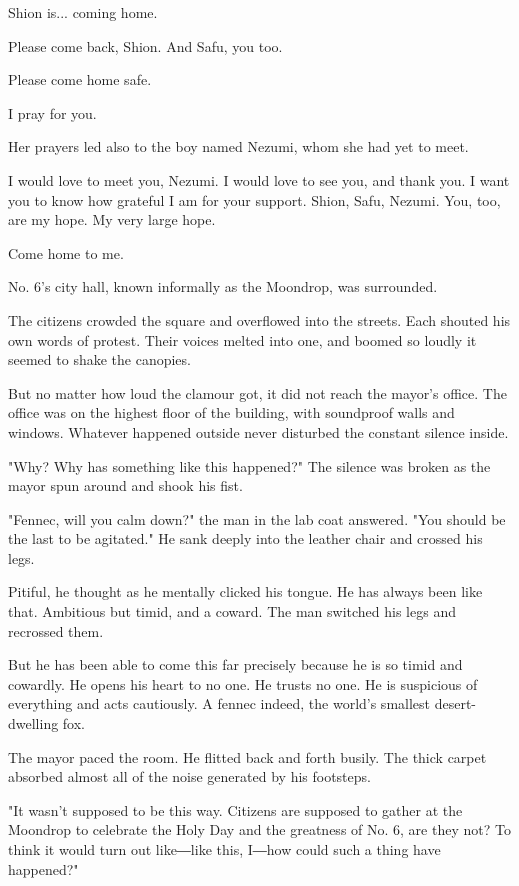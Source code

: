 Shion is... coming home.

Please come back, Shion. And Safu, you too.

Please come home safe.

I pray for you.

Her prayers led also to the boy named Nezumi, whom she had yet to meet.

I would love to meet you, Nezumi. I would love to see you, and thank
you. I want you to know how grateful I am for your support. Shion, Safu,
Nezumi. You, too, are my hope. My very large hope.

Come home to me.

No. 6's city hall, known informally as the Moondrop, was surrounded.

The citizens crowded the square and overflowed into the streets. Each
shouted his own words of protest. Their voices melted into one, and
boomed so loudly it seemed to shake the canopies.

But no matter how loud the clamour got, it did not reach the mayor's
office. The office was on the highest floor of the building, with
soundproof walls and windows. Whatever happened outside never disturbed
the constant silence inside.

"Why? Why has something like this happened?" The silence was broken as
the mayor spun around and shook his fist.~

"Fennec, will you calm down?" the man in the lab coat answered. "You
should be the last to be agitated." He sank deeply into the leather
chair and crossed his legs.

Pitiful, he thought as he mentally clicked his tongue. He has always
been like that. Ambitious but timid, and a coward. The man switched his
legs and recrossed them.

But he has been able to come this far precisely because he is so timid
and cowardly. He opens his heart to no one. He trusts no one. He is
suspicious of everything and acts cautiously. A fennec indeed, the
world's smallest desert-dwelling fox.

The mayor paced the room. He flitted back and forth busily. The thick
carpet absorbed almost all of the noise generated by his footsteps.

"It wasn't supposed to be this way. Citizens are supposed to gather at
the Moondrop to celebrate the Holy Day and the greatness of No. 6, are
they not? To think it would turn out like―like this, I―how could such a
thing have happened?"

